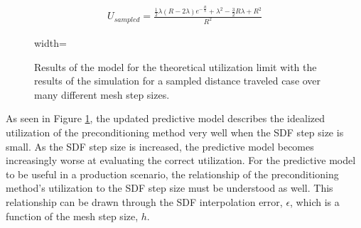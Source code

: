 
\begin{equation}
  \begin{split}
    U_{sampled} = \frac{\frac{1}{2} \lambda (R - 2 \lambda) e^{-\frac{R}{\lambda}} + \lambda^{2} - \frac{3}{2} R \lambda + R^{2} }{R^{2}}
  \end{split}
  \label{eq:sdf_model_sampled}
\end{equation}

\begin{figure}[ht] 
\centering
{width=\textwidth}
\caption{Results of the model for the theoretical utilization limit with the
  results of the simulation for a sampled distance traveled case over many
  different mesh step sizes.}
\label{fig:sdf_sampled_dist}
\end{figure}

As seen in Figure \ref{fig:sdf_sampled_dist}, the updated predictive model
describes the idealized utilization of the preconditioning method very well when
the SDF step size is small. As the SDF step size is increased, the predictive
model becomes increasingly worse at evaluating the correct utilization. For the
predictive model to be useful in a production scenario, the relationship of the
preconditioning method's utilization to the SDF step size must be understood as
well. This relationship can be drawn through the SDF interpolation error,
$\epsilon$, which is a function of the mesh step size, $h$.




